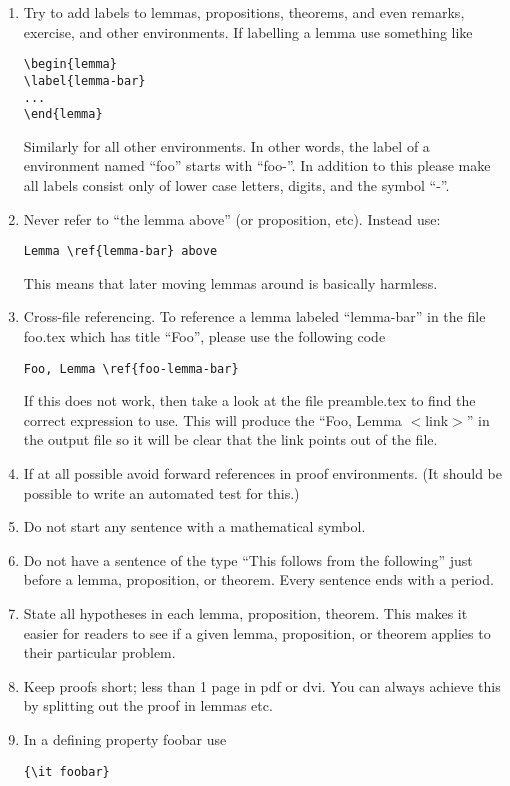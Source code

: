 \begin{enumerate}
\begin{verbatim}
\end{verbatim}
\item Try to add labels to lemmas, propositions, theorems, and even
remarks, exercise, and other environments.
If labelling a lemma use something like
\begin{verbatim}
\begin{lemma}
\label{lemma-bar}
...
\end{lemma}
\end{verbatim}
Similarly for all other environments. In other words, the label
of a environment named ``foo'' starts with ``foo-''. In addition to
this please make all labels consist only of lower case letters,
digits, and the symbol ``-''.
\item Never refer to ``the lemma above'' (or proposition, etc).
Instead use:
\begin{verbatim}
Lemma \ref{lemma-bar} above
\end{verbatim}
This means that later
moving lemmas around is basically harmless.
\item Cross-file referencing. To reference a lemma labeled
``lemma-bar'' in the file foo.tex which has title
``Foo'', please use the following code
\begin{verbatim}
Foo, Lemma \ref{foo-lemma-bar}
\end{verbatim}
If this does not work, then take a look at the file
preamble.tex to find the correct expression to use.
This will produce the ``Foo, Lemma $<$link$>$'' in the 
output file so it will be clear that the link points
out of the file.
\item If at all possible avoid forward references in proof
environments. (It should be possible to write an automated
test for this.)
\item Do not start any sentence with a mathematical symbol.
\item Do not have a sentence of the type ``This follows from
the following'' just before a lemma, proposition, or theorem.
Every sentence ends with a period.
\item State all hypotheses in each lemma, proposition, theorem.
This makes it easier for readers to see if a given
lemma, proposition, or theorem applies to their particular
problem.
\item Keep proofs short; less than 1 page in pdf or dvi.
You can always achieve this by splitting out the proof in lemmas
etc.
\item In a defining property foobar use
\begin{verbatim}
{\it foobar}

\end{verbatim}
\end{enumerate}
